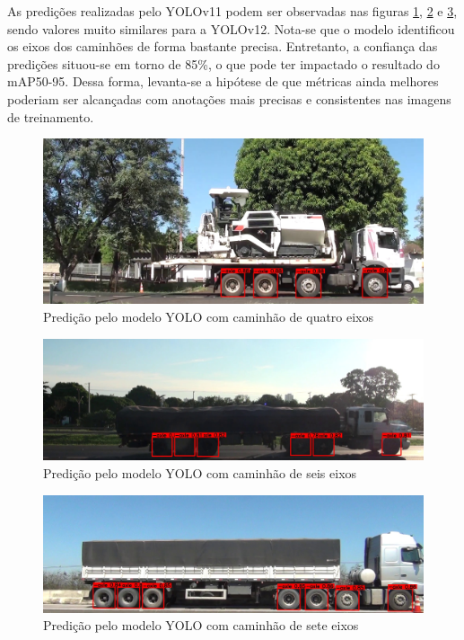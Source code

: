        As predições realizadas pelo YOLOv11 podem ser observadas nas figuras \ref{fig:predicao_yolo_1}, \ref{fig:predicao_yolo_2} e \ref{fig:predicao_yolo_3}, sendo valores muito similares para a YOLOv12. Nota-se que o modelo identificou os eixos dos caminhões de forma bastante precisa. Entretanto, a confiança das predições situou-se em torno de 85\%, o que pode ter impactado o resultado do mAP50-95. Dessa forma, levanta-se a hipótese de que métricas ainda melhores poderiam ser alcançadas com anotações mais precisas e consistentes nas imagens de treinamento.

        \begin{figure} [!htb]
            \centering
            \includegraphics[width=1\linewidth]{Images//yolo_outputs/yolo_output_20170418095402_color-[ROI-1]-94(1).jpg}
            \caption{Predição pelo modelo YOLO com caminhão de quatro eixos}
            \label{fig:predicao_yolo_1}
        \end{figure}

        \begin{figure} [!htb]
            \centering
            \includegraphics[width=1\linewidth]{Images//yolo_outputs/yolo_output_20170418074140-550_color-[ROI-1]-30.jpg}
            \caption{Predição pelo modelo YOLO com caminhão de seis eixos}
            \label{fig:predicao_yolo_2}
        \end{figure}

        \begin{figure} [!htb]
            \centering
            \includegraphics[width=1\linewidth]{Images//yolo_outputs/yolo_output_20160927102749_color-[ROI-1]-1.jpg}
            \caption{Predição pelo modelo YOLO com caminhão de sete eixos}
            \label{fig:predicao_yolo_3}
        \end{figure}
        
